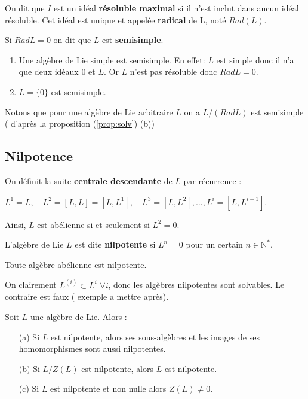 \documentclass[a4paper,openany,12pt]{report}
\newcommand{\NN}{\mathbb{N}}
\theoremstyle{break}
{\theorembodyfont{\upshape}
\newtheorem*{rmq}{Remarque :}
\newtheorem*{prv}{Preuve :}
\newtheorem*{ex}{Exemples :}
\newtheorem{exe}{Exemple : }
\newtheorem*{nota}{Notation :}}
\begin{document}
\begin{df}
\quad On dit que $I$ est un idéal \textbf{résoluble maximal} si il n'est inclut dans aucun idéal résoluble. Cet idéal est unique et appelée \textbf{radical} de L, noté $Rad(L)$.
\end{df}

\begin{df}
\quad Si $Rad L=0$ on dit que $L$ est \textbf{semisimple}.
\end{df}

\begin{ex}
\begin{enumerate}
\item Une algèbre de Lie simple est semisimple.
En effet: $L$ est simple donc il n'a que deux idéaux ${0}$ et $L$. Or $L$ n'est pas résoluble donc $Rad L= {0}$.

\item $L= \{0\}$ est semisimple.
\end{enumerate}
\end{ex}

Notons que pour une algèbre de Lie arbitraire $L$ on a $L/(Rad L)$ est semisimple ( d'après la proposition (\ref{prop:solv}) (b))

\subsection{Nilpotence}

On définit la suite \textbf{centrale descendante} de $L$ par récurrence :
\begin{center}
$L^{1}=L, \quad L^{2}=[L, L]=\left[L, L^{1}\right], \quad L^{3}=\left[L, L^{2}\right], \ldots, L^{i}=\left[L, L^{i-1}\right]$.
\end{center}
Ainsi, $L$ est abélienne si et seulement si $L^{2}=0$.

\begin{df}
L'algèbre de Lie $L$ est dite \textbf{nilpotente} si $L^{n}=0$ pour un certain $n \in \NN^{*}$.
\end{df}

\begin{exe}
Toute algèbre abélienne est nilpotente.

On clairement $L^{(i)}\subset L^{i}$ $\forall i$, donc les algèbres nilpotentes sont solvables.
Le contraire est faux ( exemple a mettre après).
\end{exe}

\begin{prop}\label{prop:nilp}
\quad Soit $L$ une algèbre de Lie. Alors :
\begin{itemize}
\item[(a)] Si $L$ est nilpotente, alors ses sous-algèbres et les images de ses homomorphismes sont aussi nilpotentes.

\item[(b)]  Si $L/Z(L)$ est nilpotente, alors $L$ est nilpotente.

\item[(c)] Si $L$ est nilpotente et non nulle alors $Z(L) \ne 0$.
\end{itemize}
\end{prop}
\end{document}
